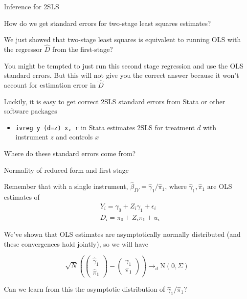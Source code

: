 \documentclass[11pt,english,handout]{beamer}
\newenvironment{wideitemize}{\itemize\addtolength{\itemsep}{10pt}}{\enditemize}
\begin{document}
\begin{frame}{Inference for 2SLS}
	\begin{wideitemize}
		\item
		How do we get standard errors for two-stage least squares estimates? 
		
		\pause
		\item
		We just showed that two-stage least squares is equivalent to running OLS with the regressor $\hat{D}$ from the first-stage? 
		
		\pause
		\item
		You might be tempted to just run this second stage regression and use the OLS standard errors. \pause{} But this will not give you the correct answer because it won't account for estimation error in $\hat{D}$
		
		\pause
		\item
		Luckily, it is easy to get correct 2SLS standard errors from Stata or other software packages
			\begin{itemize}
				\item
				\texttt{ivreg y (d=z) x, r} in Stata estimates 2SLS for treatment $d$ with instrument $z$ and controls $x$
			\end{itemize}
		
		\pause
		\item
		Where do these standard errors come from? 
	\end{wideitemize}
\end{frame}


\begin{frame}{Normality of reduced form and first stage}
	\begin{wideitemize}
		\item
		Remember that with a single instrument, $\hat\beta_{IV} = \hat\gamma_1 / \hat\pi_1$, where $\hat\gamma_1,\hat\pi_1$ are OLS estimates of
		\begin{align*}
			&Y_{i} = \gamma_0 +   Z_i \gamma_1 + \epsilon_{i} \\
			&D_i = \pi_0 + Z_i \pi_1 + u_i
		\end{align*}
	
		\pause
		\item
		We've shown that OLS estimates are asymptotically normally distributed (and these convergences hold jointly), so we will have
		
		$$\sqrt{N}\left( \left( \begin{array}{ll} \hat\gamma_1 \\ \hat\pi_1 \end{array} \right)- \left( \begin{array}{ll} \gamma_1 \\ \pi_1 \end{array} \right) \right) \rightarrow_d \mathrm{N}(0,\Sigma)$$
	
		\pause
		\item
		Can we learn from this the asymptotic distribution of $\hat\gamma_1 / \hat\pi_1$?
	\end{wideitemize}
\end{frame}
\end{document}
